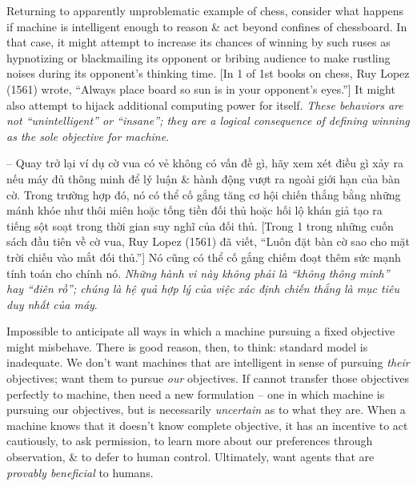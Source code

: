 \documentclass{article}
\begin{document}
\begin{itemize}
\begin{itemize}
\begin{itemize}
\begin{itemize}
				Returning to apparently unproblematic example of chess, consider what happens if machine is intelligent enough to reason \& act beyond confines of chessboard. In that case, it might attempt to increase its chances of winning by such ruses as hypnotizing or blackmailing its opponent or bribing audience to make rustling noises during its opponent's thinking time. [In 1 of 1st books on chess, {\sc Ruy Lopez} (1561) wrote, ``Always place board so sun is in your opponent's eyes.''] It might also attempt to hijack additional computing power for itself. {\it These behaviors are not ``unintelligent'' or ``insane''; they are a logical consequence of defining winning as the sole objective for machine}.

				-- Quay trở lại ví dụ cờ vua có vẻ không có vấn đề gì, hãy xem xét điều gì xảy ra nếu máy đủ thông minh để lý luận \& hành động vượt ra ngoài giới hạn của bàn cờ. Trong trường hợp đó, nó có thể cố gắng tăng cơ hội chiến thắng bằng những mánh khóe như thôi miên hoặc tống tiền đối thủ hoặc hối lộ khán giả tạo ra tiếng sột soạt trong thời gian suy nghĩ của đối thủ. [Trong 1 trong những cuốn sách đầu tiên về cờ vua, {\sc Ruy Lopez} (1561) đã viết, ``Luôn đặt bàn cờ sao cho mặt trời chiếu vào mắt đối thủ.''] Nó cũng có thể cố gắng chiếm đoạt thêm sức mạnh tính toán cho chính nó. {\it Những hành vi này không phải là ``không thông minh'' hay ``điên rồ''; chúng là hệ quả hợp lý của việc xác định chiến thắng là mục tiêu duy nhất của máy}.

				Impossible to anticipate all ways in which a machine pursuing a fixed objective might misbehave. There is good reason, then, to think: standard model is inadequate. We don't want machines that are intelligent in sense of pursuing {\it their} objectives; want them to pursue {\it our} objectives. If cannot transfer those objectives perfectly to machine, then need a new formulation -- one in which machine is pursuing our objectives, but is necessarily {\it uncertain} as to what they are. When a machine knows that it doesn't know complete objective, it has an incentive to act cautiously, to ask permission, to learn more about our preferences through observation, \& to defer to human control. Ultimately, want agents that are {\it provably beneficial} to humans.


\end{itemize}
\end{itemize}
\end{itemize}
\end{itemize}
\end{document}
